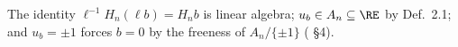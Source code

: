 The identity $\ell^{-1}H_n(\ell b)=H_nb$ is linear algebra; $u_b\in A_n\subseteq\RE$ by \cite{KY} Def.~2.1; and $u_b=\pm1$ forces $b=0$ by the freeness of $A_n/\{\pm1\}$ (\cite{KY} \S4).
